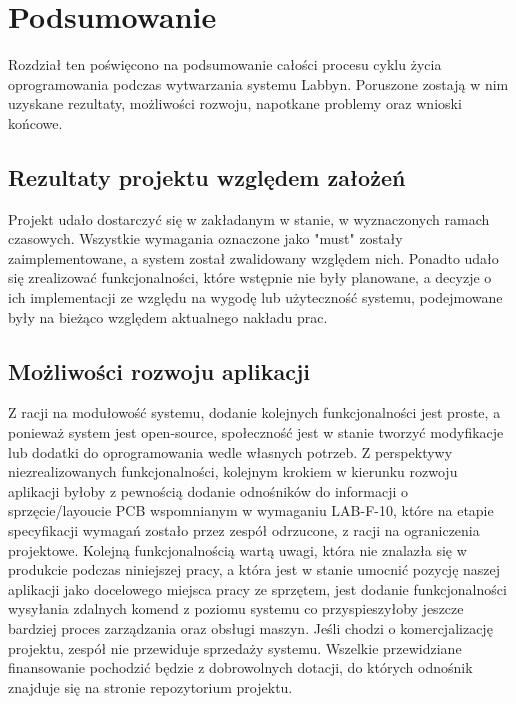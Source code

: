 \chapter{Podsumowanie}
\par
Rozdział ten poświęcono na podsumowanie całości procesu cyklu życia oprogramowania podczas wytwarzania systemu \gls{Labbyn}.
Poruszone zostają w nim uzyskane rezultaty, możliwości rozwoju, napotkane problemy oraz wnioski końcowe.

\section{Rezultaty projektu względem założeń}
\par
Projekt udało dostarczyć się w zakładanym w stanie, w wyznaczonych ramach czasowych.
Wszystkie wymagania oznaczone jako "must" zostały zaimplementowane, a system został zwalidowany względem nich.
Ponadto udało się zrealizować funkcjonalności, które wstępnie nie były planowane, a decyzje o ich implementacji ze względu na wygodę lub użyteczność systemu, podejmowane były na bieżąco względem aktualnego nakładu prac. 

\section{Możliwości rozwoju aplikacji}
\par
Z racji na modułowość systemu, dodanie kolejnych funkcjonalności jest proste, a ponieważ system jest \gls{open-source}, społeczność jest w stanie tworzyć modyfikacje lub dodatki do oprogramowania wedle własnych potrzeb.
Z perspektywy niezrealizowanych funkcjonalności, kolejnym krokiem w kierunku rozwoju aplikacji byłoby z pewnością dodanie odnośników do informacji o sprzęcie/layoucie PCB wspomnianym w wymaganiu LAB-F-10, które na etapie specyfikacji wymagań zostało przez zespół odrzucone, z racji na ograniczenia projektowe.
Kolejną funkcjonalnością wartą uwagi, która nie znalazła się w produkcie podczas niniejszej pracy, a która jest w stanie umocnić pozycję naszej aplikacji jako docelowego miejsca pracy ze sprzętem, jest dodanie funkcjonalności wysyłania zdalnych komend z poziomu systemu co przyspieszyłoby jeszcze bardziej proces zarządzania oraz obsługi maszyn.
Jeśli chodzi o komercjalizację projektu, zespół nie przewiduje sprzedaży systemu.
Wszelkie przewidziane finansowanie pochodzić będzie z dobrowolnych dotacji, do których odnośnik znajduje się na stronie \gls{repozytorium} projektu.

